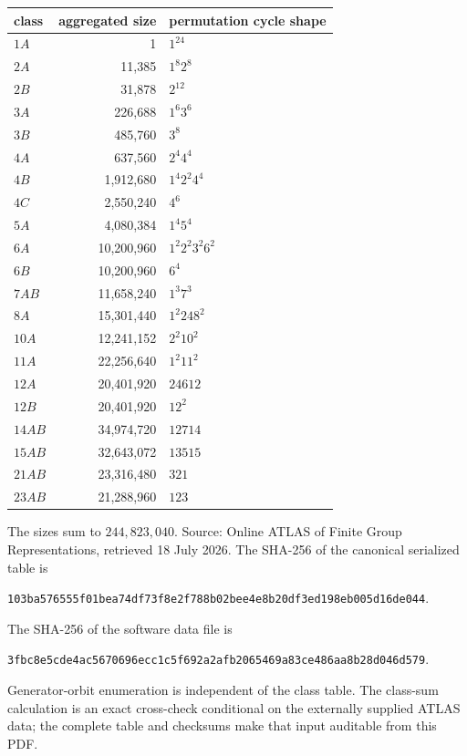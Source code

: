 \documentclass[10pt]{article}
\begin{document}
\begin{center}\scriptsize
\begin{tabular}{@{}lrl@{}}\toprule
class & aggregated size & permutation cycle shape\\\midrule
$1A$&1&$1^{24}$\\
$2A$&11,385&$1^8 2^8$\\
$2B$&31,878&$2^{12}$\\
$3A$&226,688&$1^6 3^6$\\
$3B$&485,760&$3^8$\\
$4A$&637,560&$2^4 4^4$\\
$4B$&1,912,680&$1^4 2^2 4^4$\\
$4C$&2,550,240&$4^6$\\
$5A$&4,080,384&$1^4 5^4$\\
$6A$&10,200,960&$1^2 2^2 3^2 6^2$\\
$6B$&10,200,960&$6^4$\\
$7AB$&11,658,240&$1^3 7^3$\\
$8A$&15,301,440&$1^2 2 4 8^2$\\
$10A$&12,241,152&$2^2 10^2$\\
$11A$&22,256,640&$1^2 11^2$\\
$12A$&20,401,920&$2 4 6 12$\\
$12B$&20,401,920&$12^2$\\
$14AB$&34,974,720&$1 2 7 14$\\
$15AB$&32,643,072&$1 3 5 15$\\
$21AB$&23,316,480&$3 21$\\
$23AB$&21,288,960&$1 23$\\\bottomrule
\end{tabular}
\end{center}
The sizes sum to $244{,}823{,}040$.  Source: Online ATLAS of Finite Group
Representations, retrieved 18 July 2026.  The SHA-256 of the canonical
serialized table is
\begin{center}\footnotesize
\texttt{103ba576555f01bea74df73f8e2f788b02bee4e8b20df3ed198eb005d16de044}.
\end{center}
The SHA-256 of the software data file is
\begin{center}\footnotesize
\texttt{3fbc8e5cde4ac5670696ecc1c5f692a2afb2065469a83ce486aa8b28d046d579}.
\end{center}

Generator-orbit enumeration is independent of the class table.  The class-sum
calculation is an exact cross-check conditional on the externally supplied
ATLAS data; the complete table and checksums make that input auditable from
this PDF.
\end{document}
